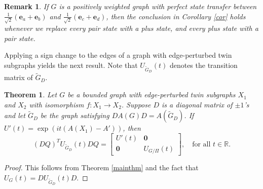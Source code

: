 \documentclass[12pt,a4paper]{article}
\newtheorem{thm}{Theorem}
\newtheorem{rem}{Remark}
\def \e {{\bf e}}
\def \e {{\mathbf e}}
\newcommand{\ob}[1]{\left(#1\right)}
\begin{document}
\begin{rem}
\label{rem3}
If $G$ is a positively weighted graph with perfect state transfer between $\frac{1}{\sqrt2}(\e_a+\e_b)$ and $\frac{1}{\sqrt2}(\e_c+\e_d)$, then the conclusion in Corollary \ref{cor} holds whenever we replace every pair state with a plus state, and every plus state with a pair state.
\end{rem}

Applying a sign change to the edges of a graph with edge-perturbed twin subgraphs yields the next result. Note that $U_{\tilde{G}_D}(t)$ denotes the transition matrix of $\tilde{G}_D$. 

\begin{thm}\label{3t3}
Let $G$ be a bounded graph with edge-perturbed twin subgraphs $X_1$ and $X_2$ with isomorphism $f:X_1\rightarrow X_2$. Suppose $D$ is a diagonal matrix of $\pm 1$'s 
and let $\tilde{G}_D$ be the graph satisfying $DA(G)D=A(\tilde{G}_D)$. %
If $U'(t)=\exp{\ob{it\ob{A\ob{X_1}-A'}}}$, then
    \[
    (DQ)^T U_{\tilde{G}_D}(t)DQ=\begin{bmatrix}
     U'(t) & \mathbf{0}\\
     \mathbf{0} & U_{G/\Pi}(t)
     \end{bmatrix},\quad \text{for all $t\in\mathbb{R}$}.
    \]
\end{thm}

\begin{proof}
This follows from Theorem \ref{mainthm} and the fact that $U_{G}(t)=DU_{\tilde{G}_D}(t)D$. 
\end{proof}
\end{document}
